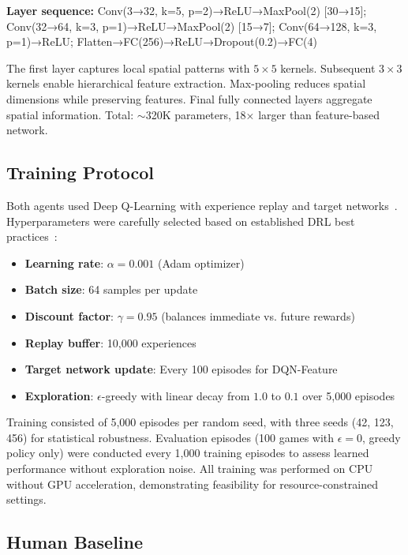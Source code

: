 \documentclass[10pt,a4paper,twocolumn]{article}
\begin{document}
\textbf{Layer sequence:} Conv(3→32, k=5, p=2)→ReLU→MaxPool(2) [30→15]; Conv(32→64, k=3, p=1)→ReLU→MaxPool(2) [15→7]; Conv(64→128, k=3, p=1)→ReLU; Flatten→FC(256)→ReLU→Dropout(0.2)→FC(4)~\cite{krizhevsky2012imagenet}

The first layer captures local spatial patterns with $5 \times 5$ kernels. Subsequent $3 \times 3$ kernels enable hierarchical feature extraction. Max-pooling reduces spatial dimensions while preserving features. Final fully connected layers aggregate spatial information. Total: $\sim$320K parameters, 18× larger than feature-based network.

\subsection{Training Protocol}

Both agents used Deep Q-Learning with experience replay and target networks~\cite{lin1993reinforcement,watkins1992q}. Hyperparameters were carefully selected based on established DRL best practices~\cite{sutton2018reinforcement}:

\begin{itemize}
    \item \textbf{Learning rate}: $\alpha = 0.001$ (Adam optimizer)
    \item \textbf{Batch size}: 64 samples per update
    \item \textbf{Discount factor}: $\gamma = 0.95$ (balances immediate vs. future rewards)
    \item \textbf{Replay buffer}: 10,000 experiences
    \item \textbf{Target network update}: Every 100 episodes for DQN-Feature
    \item \textbf{Exploration}: $\epsilon$-greedy with linear decay from $1.0$ to $0.1$ over 5,000 episodes~\cite{francois2015introduction}
\end{itemize}

Training consisted of 5,000 episodes per random seed, with three seeds (42, 123, 456) for statistical robustness. Evaluation episodes (100 games with $\epsilon = 0$, greedy policy only) were conducted every 1,000 training episodes to assess learned performance without exploration noise. All training was performed on CPU without GPU acceleration, demonstrating feasibility for resource-constrained settings.

\subsection{Human Baseline}
\end{document}
